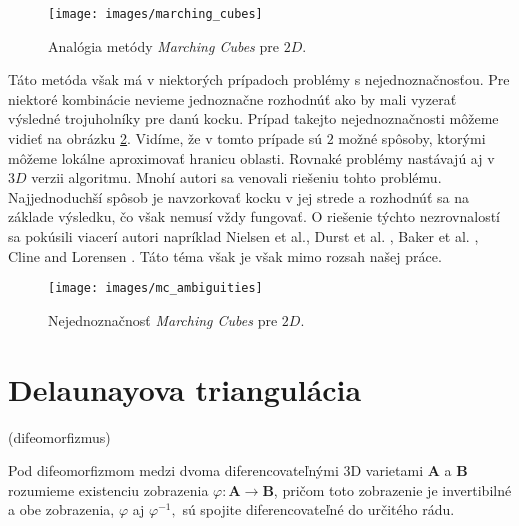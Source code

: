 \begin{figure}
    \centerline{\texttt{[image: images/marching\_cubes]}}
    \caption[Analógia metódy \textit{Marching Cubes}]{Analógia metódy \textit{Marching Cubes} pre $2D$.}
    \label{obr:marching_cubes}
\end{figure}

Táto metóda však má v niektorých prípadoch problémy s nejednoznačnosťou. Pre niektoré kombinácie
nevieme jednoznačne rozhodnúť ako by mali vyzerať výsledné trojuholníky pre danú kocku. Prípad takejto
nejednoznačnosti môžeme vidieť na obrázku \ref{obr:mc_ambiguities}. Vidíme, že v tomto prípade sú $2$ 
možné spôsoby, ktorými môžeme lokálne aproximovať hranicu oblasti. Rovnaké problémy nastávajú aj v $3D$
verzii algoritmu. Mnohí autori sa venovali riešeniu tohto problému. Najjednoduchší spôsob je navzorkovať
kocku v jej strede a rozhodnúť sa na základe výsledku, čo však nemusí vždy fungovať. O riešenie týchto 
nezrovnalostí sa pokúsili viacerí autori napríklad Nielsen et al.\cite{nielson1991asymptotic},
Durst et al. \cite{durst1988re}, Baker et al. \cite{baker1989building},
Cline and Lorensen \cite{cline1988two}. Táto téma však je však mimo rozsah našej práce.

\begin{figure}
    \centerline{\texttt{[image: images/mc\_ambiguities]}}
    \caption[Nejednoznačnosť \textit{Marching Cubes}]{Nejednoznačnosť \textit{Marching Cubes} pre $2D$.}
    \label{obr:mc_ambiguities}
\end{figure}



\section{Delaunayova triangulácia}
\label{kap:delaunay_triangulation}

\begin{definition}
    (difeomorfizmus)

    Pod difeomorfizmom medzi dvoma diferencovateľnými 3D varietami $\mathbf{A}$ a $\mathbf{B}$ 
    rozumieme existenciu zobrazenia $\varphi : \mathbf{A} \to \mathbf{B}$, pričom toto zobrazenie 
    je invertibilné a obe zobrazenia, $\varphi$ aj $\varphi^{-1},$ sú spojite diferencovateľné do určitého rádu. 
\end{definition}

